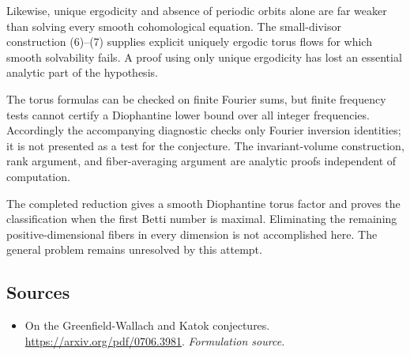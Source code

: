 \documentclass[11pt]{article}
\begin{document}
Likewise, unique ergodicity and absence of periodic orbits alone are far weaker than solving every smooth cohomological equation. The small-divisor construction (6)--(7) supplies explicit uniquely ergodic torus flows for which smooth solvability fails. A proof using only unique ergodicity has lost an essential analytic part of the hypothesis.

The torus formulas can be checked on finite Fourier sums, but finite frequency tests cannot certify a Diophantine lower bound over all integer frequencies. Accordingly the accompanying diagnostic checks only Fourier inversion identities; it is not presented as a test for the conjecture. The invariant-volume construction, rank argument, and fiber-averaging argument are analytic proofs independent of computation.

The completed reduction gives a smooth Diophantine torus factor and proves the classification when the first Betti number is maximal. Eliminating the remaining positive-dimensional fibers in every dimension is not accomplished here. The general problem remains unresolved by this attempt.

\subsection{Sources}
\begin{itemize}
\item[S1]On the Greenfield-Wallach and Katok conjectures.
\url{https://arxiv.org/pdf/0706.3981}.
\textit{Formulation source.}
\end{itemize}
\end{document}
